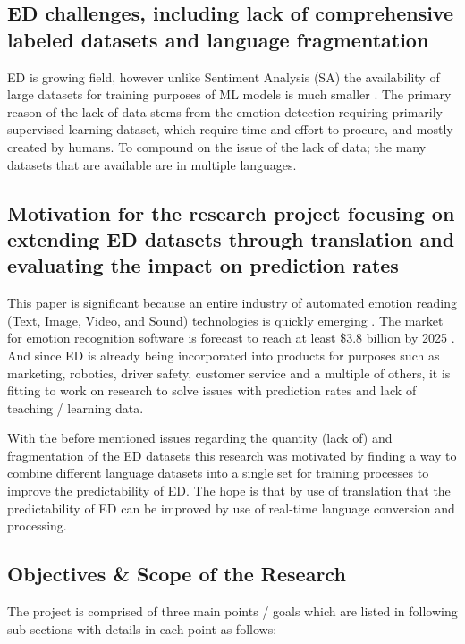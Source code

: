 \documentclass[11pt]{article}
\begin{document}
\subsection{ED challenges, including lack of comprehensive labeled datasets and language fragmentation}
ED is growing field, however unlike Sentiment Analysis (SA) the availability of large datasets for training purposes of ML models is much smaller \cite{ACLU-ED-Data}. The primary reason of the lack of data stems from the emotion detection requiring primarily supervised learning dataset, which require time and effort to procure, and mostly created by humans. To compound on the issue of the lack of data; the many datasets that are available are in multiple languages.

\subsection{Motivation for the research project focusing on extending ED datasets through translation and evaluating the impact on prediction rates}

This paper is significant because an entire industry of automated emotion reading (Text, Image, Video, and Sound) technologies is quickly emerging \cite{ACLU-ED-Data, ACLU-THE-DAWN-OF-ROBOT-SURVEILLANCE}. The market for emotion recognition software is forecast to reach at least \$3.8 billion by 2025 \cite{ACLU-ED-Data, ACLU-THE-DAWN-OF-ROBOT-SURVEILLANCE}. And since ED is already being incorporated into products for purposes such as marketing, robotics, driver safety, customer service and a multiple of others, it is fitting to work on research to solve issues with prediction rates and lack of teaching / learning data.

With the before mentioned issues regarding the quantity (lack of) and fragmentation of the ED datasets this research was motivated by finding a way to combine different language datasets into a single set for training processes to improve the predictability of ED. The hope is that by use of translation that the predictability of ED can be improved by use of real-time language conversion and processing.

\subsection{Objectives \& Scope of the Research}
The project is comprised of three main points / goals which are listed in following sub-sections with details in each point as follows:
\end{document}
